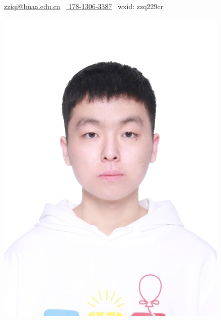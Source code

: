 \documentclass[letterpaper,11pt]{article}
\newcommand{\basicInfo}[1]{
  \centerline{\sffamily\large{#1}}
  \vspace{1.5ex}
}
\newcommand{\name}[1]{
  \centerline{\Large\songti{#1}}
  \vspace{1.25ex}
}
\begin{document}


\begin{minipage}[t]{0.12\textwidth}
\end{minipage}
\hfill
\begin{minipage}[t]{0.7\textwidth}
      \name{\textbf{赵子琦}}
      \basicInfo{
        \href{mailto:zziqi@buaa.edu.cn}{ zziqi@buaa.edu.cn} \textperiodcentered\ 
        \href{tel:17813063387}{ 178-1306-3387}    \textperiodcentered\ 
        wxid: zzq229cr}
\end{minipage}%
\hfill
\begin{minipage}[t]{0.12\textwidth}
    \vspace*{-1cm} %
    \includegraphics[width=\textwidth]{zzqpic-no-bg.png}
\end{minipage}
\end{document}
